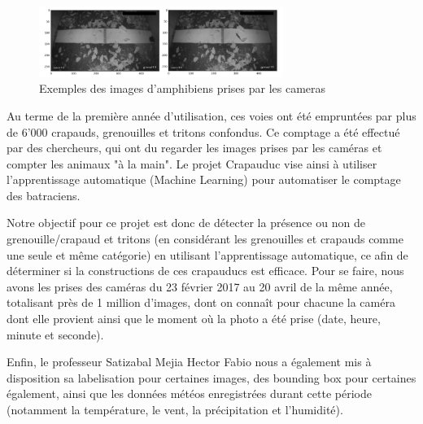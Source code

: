 \newpage

\begin{figure}[!htb]
    \centering
    \includegraphics[width=300px]{images/introduction_crapauduc_exemple_prise_camera.png}
    \caption{Exemples des images d'amphibiens prises par les cameras}
    \label{fig:Exemples des images d'amphibiens prises par les cameras}
\end{figure}

Au terme de la première année d'utilisation, ces voies ont été empruntées par plus de 6'000 crapauds, grenouilles et tritons confondus. Ce comptage a été effectué par des chercheurs, qui ont du regarder les images prises par les caméras et compter les animaux "à la main". Le projet Crapauduc vise ainsi à utiliser l'apprentissage automatique (Machine Learning) pour automatiser le comptage des batraciens. \newline

Notre objectif pour ce projet est donc de détecter la présence ou non de grenouille/crapaud et tritons (en considérant les grenouilles et crapauds comme une seule et même catégorie) en utilisant l'apprentissage automatique, ce afin de déterminer si la constructions de ces crapauducs est efficace. Pour se faire, nous avons les prises des caméras du 23 février 2017 au 20 avril de la même année, totalisant près de 1 million d'images, dont on connaît pour chacune la caméra dont elle provient ainsi que le moment où la photo a été prise (date, heure, minute et seconde).\newline

Enfin, le professeur Satizabal Mejia Hector Fabio nous a également mis à disposition sa labelisation pour certaines images, des bounding box pour certaines également, ainsi que les données météos enregistrées durant cette période (notamment la température, le vent, la précipitation et l'humidité).


